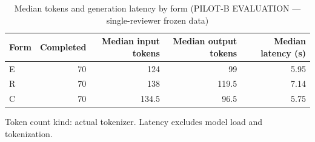 \begin{table}[t]
\centering
\small
\caption{Median tokens and generation latency by form (PILOT-B EVALUATION --- single-reviewer frozen data)}
\label{tab:pilotb-Llama-3.2-3B-Instruct-resources}
\begin{tabular}{lrrrr}
\toprule
Form & Completed & Median input tokens & Median output tokens & Median latency (s) \\
\midrule
E & 70 & 124 & 99 & 5.95 \\
R & 70 & 138 & 119.5 & 7.14 \\
C & 70 & 134.5 & 96.5 & 5.75 \\
\bottomrule
\end{tabular}
\par\smallskip
\parbox{\linewidth}{\footnotesize Token count kind: actual tokenizer. Latency excludes model load and tokenization.}
\end{table}
